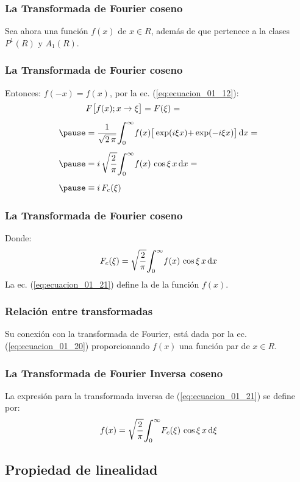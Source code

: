 \begin{frame}
\frametitle{La Transformada de Fourier coseno}
Sea ahora una función  $f (x)$ de $x \in R$, \pause además de que pertenece a la clases $P^{1}(R)$ y $A_{1}(R)$.
\end{frame}
\begin{frame}
\frametitle{La Transformada de Fourier coseno}
Entonces: $f (-x) = f (x)$, por la ec. (\ref{eq:ecuacion_01_12}):
\pause
\begin{eqnarray}
\begin{aligned}[b]
&F \big[ f (x); x \to \xi \big] = F (\xi) = \\[0.5em] \pause
&= \dfrac{1}{\sqrt{2 \, \pi}} \scaleint{6ex}_{\bs 0}^{\infty} f (x) \big[ \exp(i \xi x) {+} \exp(-i \xi x) \big] \dd{x} = \\[0.5em] \pause
&= i \, \sqrt{\dfrac{2}{\pi}} \scaleint{6ex}_{\bs 0}^{\infty} f (x) \, \cos \xi \, x \dd{x} = \\[0.5em] \pause
&\equiv i \, F_{c} (\xi)    
\end{aligned}
\label{eq:ecuacion_01_20}
\end{eqnarray}
\end{frame}
\begin{frame}
\frametitle{La Transformada de Fourier coseno}
Donde:
\pause
\begin{align}
F_{c} (\xi) = \sqrt{\dfrac{2}{\pi}} \scaleint{6ex}_{\bs 0}^{\infty} f (x) \, \cos \xi \, x \dd{x}
\label{eq:ecuacion_01_21}
\end{align}
La ec. (\ref{eq:ecuacion_01_21}) define la  de la función $f (x)$.
\end{frame}
\begin{frame}
\frametitle{Relación entre transformadas}
Su conexión con la transformada de Fourier, está dada por la ec. (\ref{eq:ecuacion_01_20}) proporcionando $f (x)$ una función par de $x \in R$.
\end{frame}
\begin{frame}
\frametitle{La Transformada de Fourier Inversa coseno}
La expresión para la transformada inversa de (\ref{eq:ecuacion_01_21}) se define por:
\pause
\begin{align}
f (x) = \sqrt{\dfrac{2}{\pi}} \scaleint{6ex}_{\bs 0}^{\infty} F_{c}(\xi) \, \cos \xi \, x \dd{\xi}
\label{eq:ecuacion_01_22}
\end{align}
\end{frame}

\subsection{Propiedad de linealidad}

